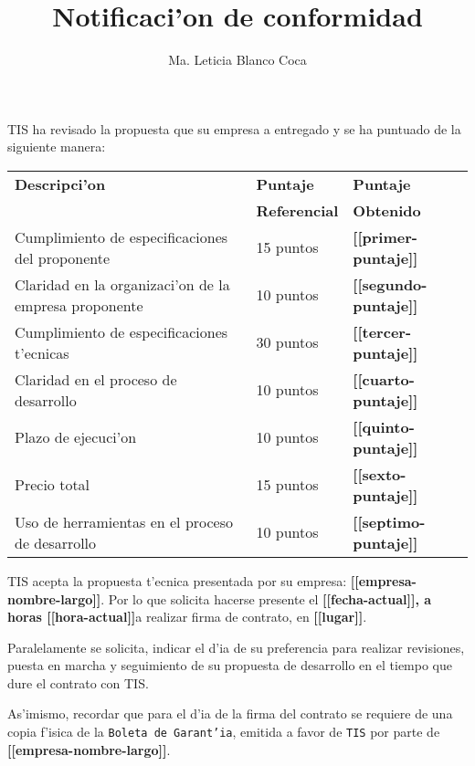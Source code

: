 \documentclass[10pt,letterpaper,twoside]{article}
\newcommand{\empresa}[0]{\textbf{[[empresa-nombre-largo]]}}
\newcommand{\diayhora}[0]{\textbf{[[fecha-actual]], a horas [[hora-actual]]}}
\newcommand{\lugar}[0]{\textbf{[[lugar]]}}
\newcommand{\pp}[0]{\textbf{[[primer-puntaje]]}}
\newcommand{\sep}[0]{\textbf{[[segundo-puntaje]]}}
\newcommand{\tp}[0]{\textbf{[[tercer-puntaje]]}}
\newcommand{\cp}[0]{\textbf{[[cuarto-puntaje]]}}
\newcommand{\qp}[0]{\textbf{[[quinto-puntaje]]}}
\newcommand{\ssp}[0]{\textbf{[[sexto-puntaje]]}}
\newcommand{\sssp}[0]{\textbf{[[septimo-puntaje]]}}
\begin{document}
\title{Notificaci'on de conformidad}
\author{Ma. Leticia Blanco Coca}
\maketitle

TIS ha revisado la propuesta que su empresa a entregado y se ha puntuado de la siguiente manera:

\begin{tabular}{|l|l|l|}
\hline \textbf{Descripci'on}& \textbf{Puntaje}&\textbf{Puntaje} \\
& \textbf{Referencial}&\textbf{Obtenido} \\
\hline
\hline Cumplimiento de especificaciones del proponente       & 15 puntos & \pp \\
\hline Claridad en la organizaci'on de la empresa proponente & 10 puntos & \sep \\
\hline Cumplimiento de especificaciones t'ecnicas            & 30 puntos & \tp \\ 
\hline Claridad en el proceso de desarrollo                  & 10 puntos & \cp\\
\hline Plazo de ejecuci'on                                   & 10 puntos & \qp \\
\hline Precio total                                          & 15 puntos & \ssp \\
\hline Uso de herramientas en el proceso de desarrollo       & 10 puntos & \sssp \\
\hline
\end{tabular}

TIS acepta la propuesta t'ecnica presentada por su empresa: \empresa. Por lo que solicita hacerse presente el \diayhora a realizar firma de contrato, en \lugar .%

Paralelamente se solicita, indicar el d'ia de su preferencia para realizar revisiones, puesta en marcha  y seguimiento de su propuesta de desarrollo en el tiempo que dure el contrato con TIS.

As'imismo, recordar que para el d'ia de la firma del contrato se requiere de una copia f'isica de la \texttt{Boleta de Garant'ia}, emitida a favor de \texttt{TIS} por parte de \empresa.
\end{document}
